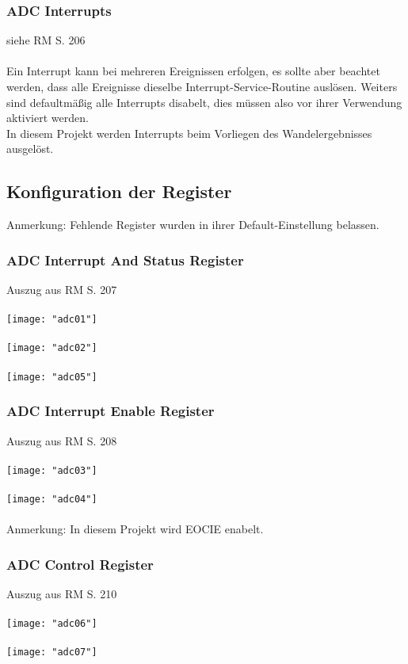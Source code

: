 \documentclass[11pt]{report}
\begin{document}
			\subsubsection{ADC Interrupts}
				siehe RM S. 206\\
				\\Ein Interrupt kann bei mehreren Ereignissen erfolgen, es sollte aber beachtet werden, dass alle Ereignisse dieselbe Interrupt-Service-Routine auslösen. Weiters sind defaultmäßig alle Interrupts disabelt, dies müssen also vor ihrer Verwendung aktiviert werden.\\
				In diesem Projekt werden Interrupts beim Vorliegen des Wandelergebnisses ausgelöst.
		\subsection{Konfiguration der Register}
			Anmerkung: Fehlende Register wurden in ihrer Default-Einstellung belassen.
			\subsubsection{ADC Interrupt And Status Register}
				Auszug aus RM S. 207\\
				\\\texttt{[image: "adc01"]}\\
				\\\texttt{[image: "adc02"]}\\
				\\\texttt{[image: "adc05"]}\\
			\subsubsection{ADC Interrupt Enable Register}
				Auszug aus RM S. 208\\
				\\\texttt{[image: "adc03"]}\\
				\\\texttt{[image: "adc04"]}\\
				\\Anmerkung: In diesem Projekt wird EOCIE enabelt.
			\subsubsection{ADC Control Register}
				Auszug aus RM S. 210\\
				\\\texttt{[image: "adc06"]}\\
				\\\texttt{[image: "adc07"]}\\
\end{document}
